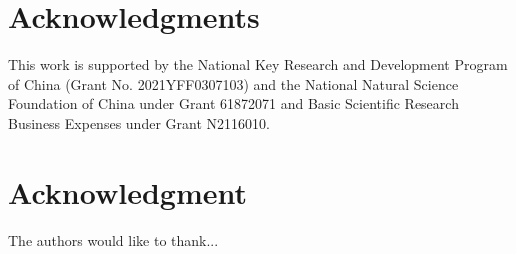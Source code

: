 \documentclass[10pt,journal,compsoc]{IEEEtran}
\begin{document}
	
	
	
	
	
	\ifCLASSOPTIONcompsoc
	\section*{Acknowledgments}  
	This work is supported by the National Key Research and Development Program of China (Grant No. 2021YFF0307103) and the National Natural Science Foundation of China under Grant 61872071 and Basic Scientific Research Business Expenses under Grant N2116010.
	\else
	\section*{Acknowledgment}
	\fi
	
	
	The authors would like to thank...
	
	
	\ifCLASSOPTIONcaptionsoff
	\newpage
	\fi
	
	
	
	
\end{document}
